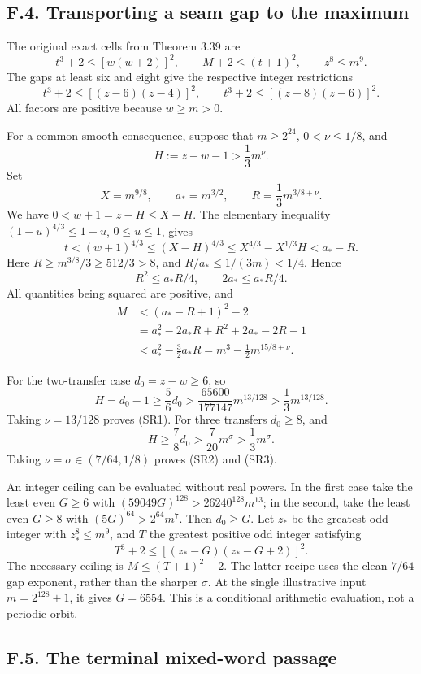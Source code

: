 \documentclass[12pt]{article}
\begin{document}
\subsection{F.4. Transporting a seam gap to the
maximum}\label{f.4.-transporting-a-seam-gap-to-the-maximum}

The original exact cells from Theorem 3.39 are \[
t^3+2\le[w(w+2)]^2,\qquad
M+2\le(t+1)^2,\qquad z^8\le m^9.
\] The gaps at least six and eight give the respective integer
restrictions \[
t^3+2\le[(z-6)(z-4)]^2,\qquad
t^3+2\le[(z-8)(z-6)]^2.
\] All factors are positive because \(w\ge m>0\).

For a common smooth consequence, suppose that \(m\ge2^{24}\),
\(0<\nu\le1/8\), and \[
H:=z-w-1>\frac13m^\nu.
\] Set \[
X=m^{9/8},\qquad a_*=m^{3/2},\qquad
R=\frac13m^{3/8+\nu}.
\] We have \(0<w+1=z-H\le X-H\). The elementary inequality
\((1-u)^{4/3}\le1-u\), \(0\le u\le1\), gives \[
t<(w+1)^{4/3}\le(X-H)^{4/3}
\le X^{4/3}-X^{1/3}H<a_*-R.
\] Here \(R\ge m^{3/8}/3\ge512/3>8\), and \(R/a_*\le1/(3m)<1/4\). Hence
\[
R^2\le a_*R/4,\qquad 2a_*\le a_*R/4.
\] All quantities being squared are positive, and \[
\begin{aligned}
M&<(a_*-R+1)^2-2\\
 &=a_*^2-2a_*R+R^2+2a_*-2R-1\\
 &<a_*^2-\frac32a_*R
  =m^3-\frac{1}{2}m^{15/8+\nu}.
\end{aligned}
\tag{F11}
\]

For the two-transfer case \(d_0=z-w\ge6\), so \[
H=d_0-1\ge\frac56d_0>
\frac{65600}{177147}m^{13/128}>\frac13m^{13/128}.
\] Taking \(\nu=13/128\) proves (SR1). For three transfers \(d_0\ge8\),
and \[
H\ge\frac78d_0>\frac7{20}m^\sigma>\frac13m^\sigma.
\] Taking \(\nu=\sigma\in(7/64,1/8)\) proves (SR2) and (SR3).

An integer ceiling can be evaluated without real powers. In the first
case take the least even \(G\ge6\) with
\((59049G)^{128}>26240^{128}m^{13}\); in the second, take the least even
\(G\ge8\) with \((5G)^{64}>2^{64}m^7\). Then \(d_0\ge G\). Let \(z_*\)
be the greatest odd integer with \(z_*^8\le m^9\), and \(T\) the
greatest positive odd integer satisfying \[
T^3+2\le[(z_*-G)(z_*-G+2)]^2.
\] The necessary ceiling is \(M\le(T+1)^2-2\). The latter recipe uses
the clean \(7/64\) gap exponent, rather than the sharper \(\sigma\). At
the single illustrative input \(m=2^{128}+1\), it gives \(G=6554\). This
is a conditional arithmetic evaluation, not a periodic orbit.

\subsection{F.5. The terminal mixed-word
passage}\label{f.5.-the-terminal-mixed-word-passage}
\end{document}
